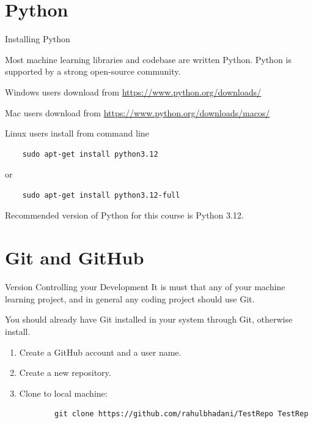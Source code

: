 \documentclass[aspectratio=169,xcolor=dvipsnames,svgnames,x11names,fleqn]{beamer}
\begin{document}
\section{Python}

\begin{frame}
    \sectionpage
\end{frame}


\begin{frame}[containsverbatim]{Installing Python}
    
    Most machine learning libraries and codebase are written Python. Python is supported by a strong open-source community.

    Windows users download from \url{https://www.python.org/downloads/}

    Mac users download from \url{https://www.python.org/downloads/macos/}

    Linux users install from command line

    \begin{verbatim}
    sudo apt-get install python3.12
    \end{verbatim}

    or 

    \begin{verbatim}
    sudo apt-get install python3.12-full
    \end{verbatim}

    Recommended version of Python for this course is Python 3.12.

\end{frame}

\section{Git and GitHub}

\begin{frame}
    \sectionpage
\end{frame}

\begin{frame}[containsverbatim]{Version Controlling your Development}
    It is must that any of your machine learning project, and in general any coding project should use Git.

    You should already have Git installed in your system through Git, otherwise install.

    \begin{enumerate}
        \item Create a GitHub account and a user name.
        \item Create a new repository.
        \item Clone to local machine:
        
        \begin{verbatim}
        git clone https://github.com/rahulbhadani/TestRepo TestRep
        \end{verbatim}

    \end{enumerate}
\end{frame}
\end{document}
